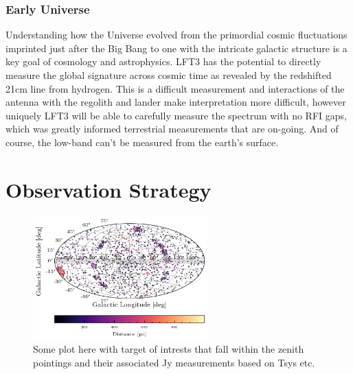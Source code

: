 \subsubsection{Early Universe}
Understanding how the Universe evolved from the primordial cosmic fluctuations imprinted just after the Big Bang  to one with the intricate galactic structure is a key goal of cosmology and astrophysics.  LFT3 has the potential to directly measure the global signature across cosmic time as revealed by the redshifted 21cm line from hydrogen.  This is a difficult measurement and interactions of the antenna with the regolith and lander make interpretation more difficult, however uniquely LFT3 will be able to carefully measure the spectrum with no RFI gaps, which was greatly informed terrestrial measurements that are on-going.  And of course, the low-band can't be measured from the earth's surface.


\section{Observation Strategy} %

\begin{figure}[h]
    \centering
    \includegraphics[width=0.6\textwidth]{figures/Science Case Plots/galactic_projection_NEA.png}
    \caption{Some plot here with target of intrests that fall within the zenith pointings and their associated Jy measurements based on Tsys etc. }
    \label{fig:enter-label}
\end{figure}